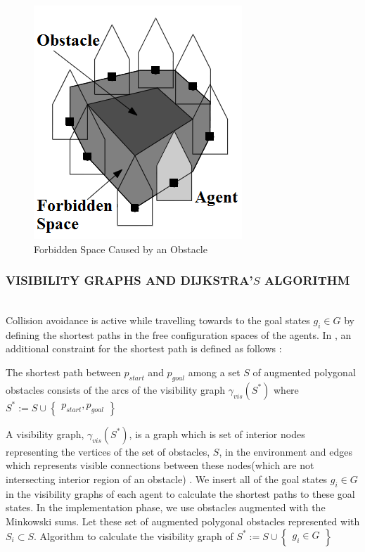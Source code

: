 \documentclass[letterpaper, 10 pt, conference]{ieeeconf}  %
\begin{document}
\begin{figure}[thpb]
     \centering
\includegraphics[scale = 0.45]{Forbidden}
  \caption{Forbidden Space Caused by an Obstacle \cite{92}} \label{yasakli_bolge}
\end{figure}
	
\subsubsection{VISIBILITY GRAPHS AND DIJKSTRA'$S$ ALGORITHM}\hspace{0pt} \\
Collision avoidance is active while travelling towards to the goal states $g_i \in G$ by defining the shortest paths in the free configuration spaces of the agents. In \cite{92}, an additional constraint for the shortest path is defined as follows : 

\begin{displayquote}
The shortest path between $p_{start}$ and $p_{goal}$ among a set $S$ of augmented polygonal obstacles consists of the arcs of the visibility graph $\gamma_{vis}(S^*)$ where $S^* := S \cup \begin{Bmatrix}
p_{start}, p_{goal}
\end{Bmatrix}$
\end{displayquote}

A visibility graph, $\gamma_{vis}(S^*)$, is a graph which is set of interior nodes representing the vertices of the set of obstacles, $S$, in the environment and edges which represents visible connections between these nodes(which are not intersecting interior region of an obstacle) \cite{92}. We insert all of the goal states $g_i \in G$ in the visibility graphs of each agent to calculate the shortest paths to these goal states. In the implementation phase, we use obstacles augmented with the Minkowski sums. Let these set of augmented polygonal obstacles represented with $S_i \subset S$. Algorithm to calculate the visibility graph of  $S^* := S \cup \begin{Bmatrix}
g_i \in G
\end{Bmatrix}$
	
\end{document}
